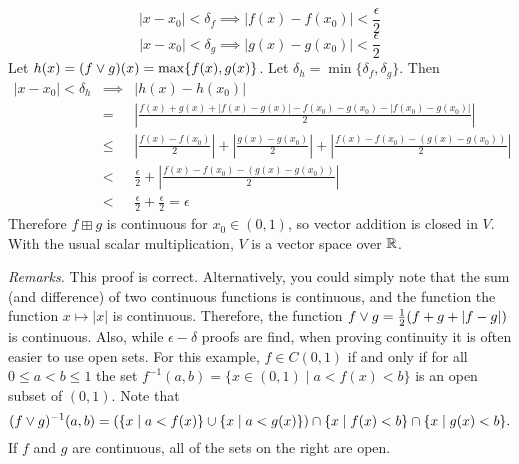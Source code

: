 $$ |x - x_0| < \delta_f \implies |f(x)-f(x_0)| < \frac{\epsilon}{2}$$ $$|x - x_0| < \delta_g \implies |g(x)-g(x_0)| < \frac{\epsilon}{2}$$
Let $h(x) = (f\vee g)(x) = \max\{f(x),g(x)\}$. Let $\delta_h = \min\{\delta_f,\delta_g\}$. Then
\begin{eqnarray*}
|x - x_0| < \delta_h & \implies & |h(x) - h(x_0)| \\ & = & \left|\frac{f(x)+g(x)+|f(x)-g(x)|-f(x_0)-g(x_0)-|f(x_0)-g(x_0)|}{2}\right| \\
& \leq & \left|\frac{f(x)-f(x_0)}{2}\right| + \left|\frac{g(x)-g(x_0)}{2}\right|
+ \left|\frac{f(x)-f(x_0)-(g(x)-g(x_0))}{2}\right| \\
& < & \frac{\epsilon}{2} + \left|\frac{f(x)-f(x_0)-(g(x)-g(x_0))}{2}\right| \\
& < & \frac{\epsilon}{2} + \frac{\epsilon}{2} = \epsilon
\end{eqnarray*}
Therefore $f \boxplus g$ is continuous for $x_0 \in (0,1)$, so vector addition is closed in $V$. With the usual scalar multiplication, $V$ is a vector space over $\mathbb{R}$.

{\it Remarks.} This proof is correct.  Alternatively, you could simply note that
the sum (and difference) of two continuous functions is continuous, and the
function the function $x \mapsto |x|$ is continuous.  Therefore, the function
$f \vee g = \frac{1}{2}(f+g+|f-g|)$ is continuous.  Also, while
$\epsilon-\delta$ proofs are find, when proving continuity it is often easier to
use open sets.  For this example, $f \in C(0,1)$ if and only if for all $0\leq a <
b \leq 1$ the set $f^{-1}(a, b) = \{x \in (0,1) \mid a< f(x) < b\}$ is an open
subset of $(0,1)$.  Note that  
\[
(f\vee g)^{-1}(a, b) =
\left(\{x \mid a< f(x)\}\cup \{x \mid a< g(x)\}\right) \cap
\{x \mid f(x)< b\} \cap \{x \mid g(x)<b\}.
\]
If $f$ and $g$ are continuous, all of the sets on the right are open.





